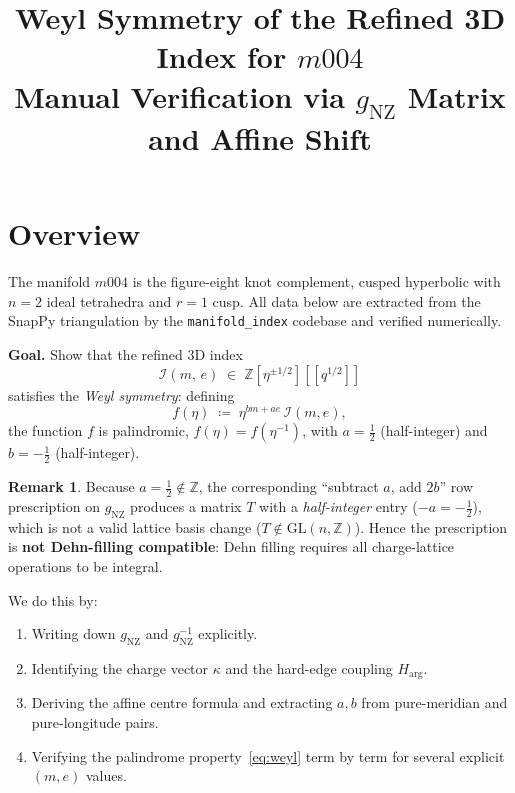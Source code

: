 \documentclass[12pt,a4paper]{article}
\title{Weyl Symmetry of the Refined 3D Index for $m004$\\[0.3em]
\large Manual Verification via $g_{\mathrm{NZ}}$ Matrix and Affine Shift}
\author{}
\date{}
\newcommand{\gNZ}{g_{\mathrm{NZ}}}
\newcommand{\IRef}{\mathcal{I}}
\newcommand{\ZZ}{\mathbb{Z}}
\theoremstyle{definition}
\newtheorem{remark}{Remark}
\begin{document}
\maketitle
\tableofcontents
\bigskip

\section{Overview}

The manifold $m004$ is the figure-eight knot complement, cusped hyperbolic
with $n=2$ ideal tetrahedra and $r=1$ cusp.
All data below are extracted from the SnapPy triangulation by the
\texttt{manifold\_index} codebase and verified numerically.

\medskip
\noindent
\textbf{Goal.}  Show that the refined 3D index
\[
  \IRef(m,\,e) \;\in\; \ZZ[\eta^{\pm 1/2}][[q^{1/2}]]
\]
satisfies the \emph{Weyl symmetry}: defining
\begin{equation}\label{eq:weyl}
  f(\eta) \;\coloneqq\; \eta^{bm+ae}\,\IRef(m,e),
\end{equation}
the function $f$ is palindromic, $f(\eta)=f(\eta^{-1})$,
with $a=\tfrac{1}{2}$ (half-integer) and $b=-\tfrac{1}{2}$ (half-integer).

\begin{remark}
Because $a=\tfrac{1}{2}\notin\ZZ$, the corresponding ``subtract $a$, add $2b$''
row prescription on $\gNZ$ produces a matrix $T$ with a
\emph{half-integer} entry ($-a=-\tfrac{1}{2}$), which is not a valid
lattice basis change ($T\notin\mathrm{GL}(n,\ZZ)$).
Hence the prescription is \textbf{not Dehn-filling compatible}:
Dehn filling requires all charge-lattice operations to be integral.
\end{remark}
We do this by:
\begin{enumerate}
  \item Writing down $\gNZ$ and $\gNZ^{-1}$ explicitly.
  \item Identifying the charge vector $\kappa$ and the hard-edge coupling
        $H_{\mathrm{arg}}$.
  \item Deriving the affine centre formula and extracting $a,b$ from
        pure-meridian and pure-longitude pairs.
  \item Verifying the palindrome property~\eqref{eq:weyl} term by term for
        several explicit $(m,e)$ values.
\end{enumerate}
\end{document}
